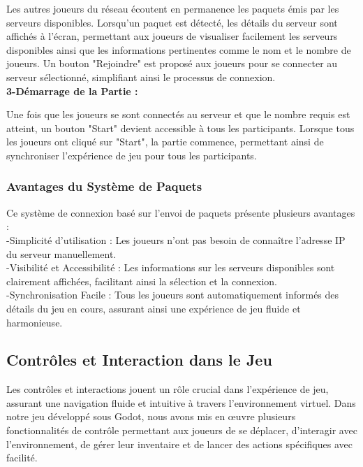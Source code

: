       Les autres joueurs du réseau écoutent en permanence les paquets émis par les serveurs disponibles.
      Lorsqu'un paquet est détecté, les détails du serveur sont affichés à l'écran, permettant aux joueurs de visualiser facilement les serveurs disponibles ainsi que les informations pertinentes comme le nom et le nombre de joueurs.
      Un bouton "Rejoindre" est proposé aux joueurs pour se connecter au serveur sélectionné, simplifiant ainsi le processus de connexion.
\\

      \textbf{3-Démarrage de la Partie :}

      Une fois que les joueurs se sont connectés au serveur et que le nombre requis est atteint, un bouton "Start" devient accessible à tous les participants.
      Lorsque tous les joueurs ont cliqué sur "Start", la partie commence, permettant ainsi de synchroniser l'expérience de jeu pour tous les participants.

      \subsubsection*{Avantages du Système de Paquets}

      Ce système de connexion basé sur l'envoi de paquets présente plusieurs avantages :
\\

      -Simplicité d'utilisation : Les joueurs n'ont pas besoin de connaître l'adresse IP du serveur manuellement.
      \\

      -Visibilité et Accessibilité : Les informations sur les serveurs disponibles sont clairement affichées, facilitant ainsi la sélection et la connexion.
      \\

      -Synchronisation Facile : Tous les joueurs sont automatiquement informés des détails du jeu en cours, assurant ainsi une expérience de jeu fluide et harmonieuse.



      \subsection{Contrôles et Interaction dans le Jeu}

      Les contrôles et interactions jouent un rôle crucial dans l'expérience de jeu, 
      assurant une navigation fluide et intuitive à travers l'environnement virtuel. 
      Dans notre jeu développé sous Godot, nous avons mis en œuvre plusieurs fonctionnalités de contrôle permettant aux joueurs de se déplacer, 
      d'interagir avec l'environnement, de gérer leur inventaire et de lancer des actions spécifiques avec facilité.
      \\

